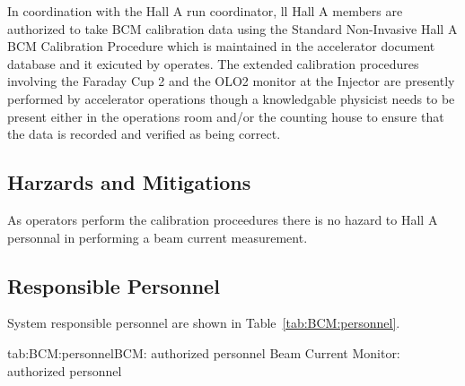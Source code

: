 {\begin{safetyen}{10}{10}

In coordination with the Hall A run coordinator, ll Hall A members are authorized 
to take BCM calibration data using the Standard 
Non-Invasive Hall A BCM Calibration Procedure which is maintained in the accelerator
document database and it exicuted by operates. The extended calibration procedures 
involving the Faraday Cup 2 and the OLO2 monitor at the Injector are presently 
performed by accelerator operations though a knowledgable physicist needs to be present either
in the operations room and/or the counting house to ensure that the data is recorded
and verified as being correct.


\subsection{Harzards and Mitigations}

As operators perform the calibration proceedures there is no hazard to Hall A personnal
in performing a beam current measurement.

\subsection{Responsible Personnel}
System responsible personnel are shown in Table~\ref{tab:BCM:personnel}.
\begin{namestab}{tab:BCM:personnel}{BCM: authorized personnel}{%
   Beam Current Monitor: authorized personnel}
\end{namestab}
\end{safetyen}
}
